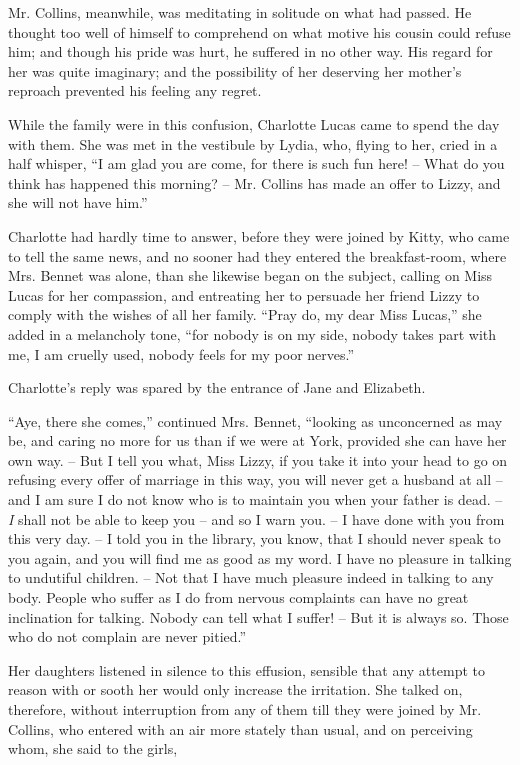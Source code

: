 Mr. Collins, meanwhile, was meditating in solitude on
what had passed. He thought too well of himself to comprehend
on what motive his cousin could refuse him; and
though his pride was hurt, he suffered in no other way.
His regard for her was quite imaginary; and the possibility
of her deserving her mother’s reproach prevented his
feeling any regret.

While the family were in this confusion, Charlotte
Lucas came to spend the day with them. She was met
in the vestibule by Lydia, who, flying to her, cried in a
half whisper, “I am glad you are come, for there is such
fun here! -- What do you think has happened this
morning? -- Mr. Collins has made an offer to Lizzy, and she will
not have him.”

Charlotte had hardly time to answer, before they were
joined by Kitty, who came to tell the same news, and no
sooner had they entered the breakfast-room, where Mrs.
Bennet was alone, than she likewise began on the subject,
calling on Miss Lucas for her compassion, and entreating
her to persuade her friend Lizzy to comply with the wishes
of all her family. “Pray do, my dear Miss Lucas,” she
added in a melancholy tone, “for nobody is on my side,
nobody takes part with me, I am cruelly used, nobody
feels for my poor nerves.”

Charlotte’s reply was spared by the entrance of Jane
and Elizabeth.

“Aye, there she comes,” continued Mrs. Bennet,
“looking as unconcerned as may be, and caring no more
for us than if we were at York, provided she can have
her own way. -- But I tell you what, Miss Lizzy, if you
take it into your head to go on refusing every offer of
marriage in this way, you will never get a husband at
all -- and I am sure I do not know who is to maintain you
when your father is dead. -- \textit{I} shall not be able to keep
you -- and so I warn you. -- I have done with you from
this very day. -- I told you in the library, you know, that
I should never speak to you again, and you will find me
as good as my word. I have no pleasure in talking to
undutiful children. -- Not that I have much pleasure indeed
in talking to any body. People who suffer as I do from
nervous complaints can have no great inclination for
talking. Nobody can tell what I suffer! -- But it is always
so. Those who do not complain are never pitied.”

Her daughters listened in silence to this effusion, sensible
that any attempt to reason with or sooth her would only
increase the irritation. She talked on, therefore, without
interruption from any of them till they were joined by
Mr. Collins, who entered with an air more stately than
usual, and on perceiving whom, she said to the girls,

